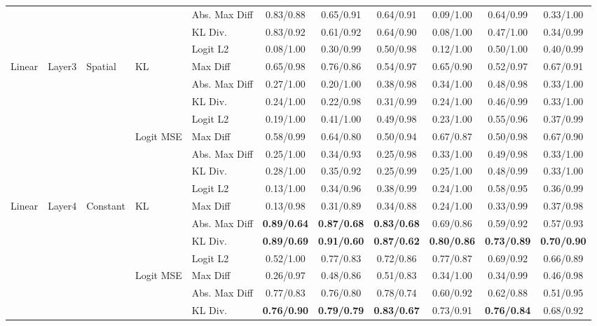 \documentclass[border=2pt]{standalone}
\begin{document}
\begin{tabular}{lllllcccccc}
 &  &  &  & Abs. Max Diff & 0.83/0.88 & 0.65/0.91 & 0.64/0.91 & 0.09/1.00 & 0.64/0.99 & 0.33/1.00 \\
 &  &  &  & KL Div. & 0.83/0.92 & 0.61/0.92 & 0.64/0.90 & 0.08/1.00 & 0.47/1.00 & 0.34/0.99 \\
 &  &  &  & Logit L2 & 0.08/1.00 & 0.30/0.99 & 0.50/0.98 & 0.12/1.00 & 0.50/1.00 & 0.40/0.99 \\
\midrule
Linear & Layer3 & Spatial & KL & Max Diff & 0.65/0.98 & 0.76/0.86 & 0.54/0.97 & 0.65/0.90 & 0.52/0.97 & 0.67/0.91 \\
 &  &  &  & Abs. Max Diff & 0.27/1.00 & 0.20/1.00 & 0.38/0.98 & 0.34/1.00 & 0.48/0.98 & 0.33/1.00 \\
 &  &  &  & KL Div. & 0.24/1.00 & 0.22/0.98 & 0.31/0.99 & 0.24/1.00 & 0.46/0.99 & 0.33/1.00 \\
 &  &  &  & Logit L2 & 0.19/1.00 & 0.41/1.00 & 0.49/0.98 & 0.23/1.00 & 0.55/0.96 & 0.37/0.99 \\
\addlinespace
 &  &  & Logit MSE & Max Diff & 0.58/0.99 & 0.64/0.80 & 0.50/0.94 & 0.67/0.87 & 0.50/0.98 & 0.67/0.90 \\
 &  &  &  & Abs. Max Diff & 0.25/1.00 & 0.34/0.93 & 0.25/0.98 & 0.33/1.00 & 0.49/0.98 & 0.33/1.00 \\
 &  &  &  & KL Div. & 0.28/1.00 & 0.35/0.92 & 0.25/0.99 & 0.25/1.00 & 0.48/0.99 & 0.33/1.00 \\
 &  &  &  & Logit L2 & 0.13/1.00 & 0.34/0.96 & 0.38/0.99 & 0.24/1.00 & 0.58/0.95 & 0.36/0.99 \\
\midrule
Linear & Layer4 & Constant & KL & Max Diff & 0.13/0.98 & 0.31/0.89 & 0.34/0.88 & 0.24/1.00 & 0.33/0.99 & 0.37/0.98 \\
 &  &  &  & Abs. Max Diff & \textbf{0.89/0.64} & \textbf{0.87/0.68} & \textbf{0.83/0.68} & 0.69/0.86 & 0.59/0.92 & 0.57/0.93 \\
 &  &  &  & KL Div. & \textbf{0.89/0.69} & \textbf{0.91/0.60} & \textbf{0.87/0.62} & \textbf{0.80/0.86} & \textbf{0.73/0.89} & \textbf{0.70/0.90} \\
 &  &  &  & Logit L2 & 0.52/1.00 & 0.77/0.83 & 0.72/0.86 & 0.77/0.87 & 0.69/0.92 & 0.66/0.89 \\
\addlinespace
 &  &  & Logit MSE & Max Diff & 0.26/0.97 & 0.48/0.86 & 0.51/0.83 & 0.34/1.00 & 0.34/0.99 & 0.46/0.98 \\
 &  &  &  & Abs. Max Diff & 0.77/0.83 & 0.76/0.80 & 0.78/0.74 & 0.60/0.92 & 0.62/0.88 & 0.51/0.95 \\
 &  &  &  & KL Div. & \textbf{0.76/0.90} & \textbf{0.79/0.79} & \textbf{0.83/0.67} & 0.73/0.91 & \textbf{0.76/0.84} & 0.68/0.92 \\

\end{tabular}
\end{document}
